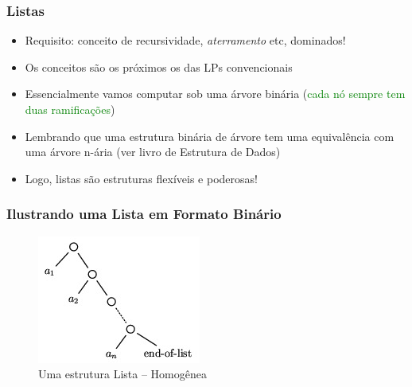 \begin{frame}[fragile]

    \frametitle{Listas}

   \begin{block}{}
     \begin{itemize}
      \item Requisito: conceito de recursividade, \textit{aterramento} etc,  dominados!
      
      \pause
      \item  Os conceitos são os próximos os das  LPs convencionais
           \pause 
     \item Essencialmente vamos computar sob uma árvore
         binária (\textcolor{green}{cada nó sempre tem duas ramificações})

           \pause 
      \item Lembrando que uma estrutura binária de árvore tem uma
      equivalência com uma árvore n-ária (ver livro de Estrutura de Dados)

           \pause 
       \item Logo,  listas são estruturas flexíveis e poderosas!

    \end{itemize}
    
    \end{block}
    
\end{frame}





\begin{frame}
\frametitle{Ilustrando uma Lista em Formato Binário}

\begin{figure}[!htb]
\centering
\includegraphics[width=.7\textwidth, height=0.650\textheight]{figures/ilustra-lista-01.jpg}
\caption{Uma estrutura  Lista -- Homogênea}
\end{figure}

\end{frame}


